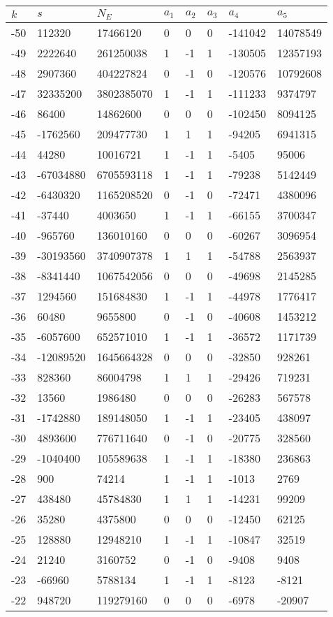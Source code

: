 \documentclass{amsart}
\begin{document}
\begin{longtable}{|l|l|l|lllll|}
\hline
$k$ & $s$ & $N_E$ & $a_1$ & $a_2$ & $a_3$ & $a_4$ & $a_5$\\
\hline
-50&112320&17466120&0&0&0&-141042&14078549\\
-49&2222640&261250038&1&-1&1&-130505&12357193\\
-48&2907360&404227824&0&-1&0&-120576&10792608\\
-47&32335200&3802385070&1&-1&1&-111233&9374797\\
-46&86400&14862600&0&0&0&-102450&8094125\\
-45&-1762560&209477730&1&1&1&-94205&6941315\\
-44&44280&10016721&1&-1&1&-5405&95006\\
-43&-67034880&6705593118&1&-1&1&-79238&5142449\\
-42&-6430320&1165208520&0&-1&0&-72471&4380096\\
-41&-37440&4003650&1&-1&1&-66155&3700347\\
-40&-965760&136010160&0&0&0&-60267&3096954\\
-39&-30193560&3740907378&1&1&1&-54788&2563937\\
-38&-8341440&1067542056&0&0&0&-49698&2145285\\
-37&1294560&151684830&1&-1&1&-44978&1776417\\
-36&60480&9655800&0&-1&0&-40608&1453212\\
-35&-6057600&652571010&1&-1&1&-36572&1171739\\
-34&-12089520&1645664328&0&0&0&-32850&928261\\
-33&828360&86004798&1&1&1&-29426&719231\\
-32&13560&1986480&0&0&0&-26283&567578\\
-31&-1742880&189148050&1&-1&1&-23405&438097\\
-30&4893600&776711640&0&-1&0&-20775&328560\\
-29&-1040400&105589638&1&-1&1&-18380&236863\\
-28&900&74214&1&-1&1&-1013&2769\\
-27&438480&45784830&1&1&1&-14231&99209\\
-26&35280&4375800&0&0&0&-12450&62125\\
-25&128880&12948210&1&-1&1&-10847&32519\\
-24&21240&3160752&0&-1&0&-9408&9408\\
-23&-66960&5788134&1&-1&1&-8123&-8121\\
-22&948720&119279160&0&0&0&-6978&-20907\\

\end{longtable}
\end{document}
